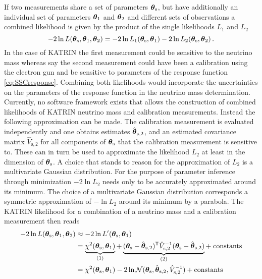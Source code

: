 If two measurements share a set of parameters $\boldsymbol{\mathbf{\theta}}_\mathrm{s}$, but have additionally an individual set of parameters $\boldsymbol{\mathbf{\theta}}_1$ and $\boldsymbol{\mathbf{\theta}}_2$ and different sets of observations a combined likelihood is given by the product of the single likelihoods $L_1$ and $L_2$
\begin{equation}
-2\ln L(\boldsymbol{\mathbf{\theta}}_\mathrm{s}, \boldsymbol{\mathbf{\theta}}_1, \boldsymbol{\mathbf{\theta}}_2) =  
-2\ln L_1(\boldsymbol{\mathbf{\theta}}_\mathrm{s}, \boldsymbol{\mathbf{\theta}}_1)
-2\ln L_2(\boldsymbol{\mathbf{\theta}}_\mathrm{s}, \boldsymbol{\mathbf{\theta}}_2)
\text{\,.}
\end{equation}
In the case of KATRIN the first measurement could be sensitive to the neutrino mass whereas say the second measurement could have been a calibration using the electron gun and be sensitive to parameters of the response function \eqref{eq:SSCresponse}. Combining both likelihoods would incorporate the uncertainties on the parameters of the response function in the neutrino mass determination. Currently, no software framework exists that allows the construction of combined likelihoods of KATRIN neutrino mass and calibration measurements. Instead the following approximation can be made. The calibration measurement is evaluated independently and one obtains estimates $\hat{\boldsymbol{\mathbf{\theta}}}_\mathrm{s,2}$, and an estimated covariance matrix $\hat{V}_\mathrm{s,2}$ for all components of $\boldsymbol{\mathbf{\theta}}_\mathrm{s}$ that the calibration measurement is sensitive to. These can in turn be used to approximate the likelihood $L_2$ at least in the dimension of $\boldsymbol{\mathbf{\theta}}_\mathrm{s}$. A choice that stands to reason for the approximation of $L_2$ is a multivariate Gaussian distribution. For the purpose of parameter inference through minimization $-2\ln L_2$ needs only to be accurately approximated around its minimum. The choice of a multivariate Gaussian distribution corresponds a symmetric approximation of $-\ln L_2$ around its minimum by a parabola. The KATRIN likelihood for a combination of a neutrino mass and a calibration measurement then reads
\begin{equation}
\begin{split}
\label{eq:penalizedLikelihood}
-2\ln L(\paramVecShared, \paramVec_1, \paramVec_2) &\approx
-2\ln L^\prime(\paramVecShared, \paramVec_1) \\ &=
\underbrace{
	\chi^2(\paramVecShared, \paramVec_1)
	\vphantom{(\paramVecShared - \hat{\paramVec}_\mathrm{s,2})^{\mathsf{T}}}
}_{(1)}
+
\underbrace{
	(\paramVecShared - \hat{\paramVec}_\mathrm{s,2})^{\mathsf{T}}
	\hat{V}_\mathrm{s,2}^{-1}
	(\paramVecShared - \hat{\paramVec}_\mathrm{s,2})
}_{(2)} +\; 
\mathrm{ constants}\\ &=
\chi^2(\paramVecShared, \paramVec_1) 
-2\ln \mathcal{N}(\paramVecShared, \hat{\paramVec}_\mathrm{s,2}, \hat{V}_\mathrm{s,2}^{-1}) +
\mathrm{ constants}
\end{split}
\end{equation}
